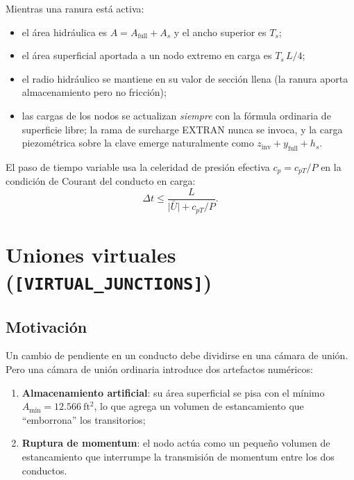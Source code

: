\documentclass[11pt,a4paper]{article}
\newcommand{\sfft}{\mathrm{ft^2}}
\begin{document}
Mientras una ranura está activa:
\begin{itemize}[nosep]
  \item el área hidráulica es $A = A_{\mathrm{full}} + A_s$ y el ancho superior
        es $T_s$;
  \item el área superficial aportada a un nodo extremo en carga es
        $T_s\,L/4$;
  \item el radio hidráulico se mantiene en su valor de sección llena (la
        ranura aporta almacenamiento pero no fricción);
  \item las cargas de los nodos se actualizan \emph{siempre} con la fórmula
        ordinaria de superficie libre; la rama de surcharge EXTRAN nunca se
        invoca, y la carga piezométrica sobre la clave emerge naturalmente como
        $z_{\mathrm{inv}} + y_{\mathrm{full}} + h_s$.
\end{itemize}
El paso de tiempo variable usa la celeridad de presión efectiva
$c_p = c_{pT}/P$ en la condición de Courant del conducto en carga:
\begin{equation}
  \Delta t \le \frac{L}{\lvert \bar U \rvert + c_{pT}/P}.
\end{equation}

\section{Uniones virtuales (\texttt{[VIRTUAL\_JUNCTIONS]})}
\label{sec:vj}

\subsection{Motivación}

Un cambio de pendiente en un conducto debe dividirse en una cámara de unión.
Pero una cámara de unión ordinaria introduce dos artefactos numéricos:
\begin{enumerate}[nosep]
  \item \textbf{Almacenamiento artificial}: su área superficial se pisa con el
        mínimo $A_{\min} = 12.566\ \sfft$, lo que agrega un volumen de
        estancamiento que ``emborrona'' los transitorios;
  \item \textbf{Ruptura de momentum}: el nodo actúa como un pequeño volumen de
        estancamiento que interrumpe la transmisión de momentum entre los dos
        conductos.
\end{enumerate}
\end{document}
